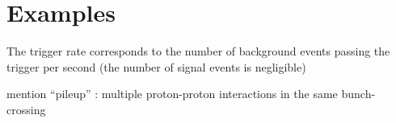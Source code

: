 \section{Examples}
\label{sec:examples}

The trigger rate corresponds to the number of background events passing the trigger per second (the number of signal events is negligible)

mention ``pileup'' : multiple proton-proton interactions in the same bunch-crossing





